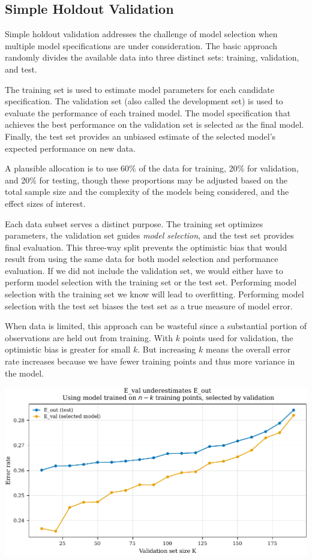 \subsection{Simple Holdout Validation}

Simple holdout validation addresses the challenge of model selection when multiple model specifications are under consideration. 
The basic approach randomly divides the available data into three distinct sets: training, validation, and test.

The training set is used to estimate model parameters for each candidate specification. 
The validation set (also called the development set) is used to evaluate the performance of each trained model. 
The model specification that achieves the best performance on the validation set is selected as the final model. 
Finally, the test set provides an unbiased estimate of the selected model's expected performance on new data.

A plausible allocation is to use 60\% of the data for training, 20\% for validation, and 20\% for testing, though these proportions may be adjusted based on the total sample size and the complexity of the models being considered, and the effect sizes of interest.

Each data subset serves a distinct purpose. The training set optimizes parameters, the validation set guides \emph{model selection}, and the test set provides final evaluation. 
This three-way split prevents the optimistic bias that would result from using the same data for both model selection and performance evaluation. If we did not include the validation set, we would either have to perform model selection with the training set or the test set. Performing model selection with the training set we know will lead to overfitting. 
Performing model selection with the test set biases the test set as a true measure of model error. 


When data is limited, this approach can be wasteful since a substantial portion of observations are held out from training. With $k$ points used for validation, the optimistic bias is greater for small $k$. But increasing $k$ means the overall error rate increases because we have fewer training points and thus more variance in the model. 

\begin{center}
\includegraphics[width=.9\textwidth]{images/line_simple_holdout_validation_k.pdf}
\end{center}

